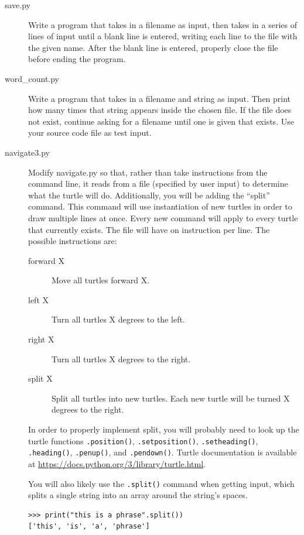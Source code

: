 \documentclass[11pt]{cselabheader}
\begin{document}
\begin{description}
\item[save.py] Write a program that takes in a filename as input, then takes in a series of lines of input until a blank line is entered, writing each line to the file with the given name. After the blank line is entered, properly close the file before ending the program.
\item[word\_count.py] Write a program that takes in a filename and string as input. Then print how many times that string appears inside the chosen file. If the file does not exist, continue asking for a filename until one is given that exists. Use your source code file as test input.
\item[navigate3.py] Modify navigate.py so that, rather than take instructions from the command line, it reads from a file (specified by user input) to determine what the turtle will do. Additionally, you will be adding the ``split'' command. This command will use instantiation of new turtles in order to draw multiple lines at once. Every new command will apply to every turtle that currently exists. The file will have on instruction per line. The possible instructions are:

  \begin{description}
    \item[forward X] Move all turtles forward X.
    \item[left X] Turn all turtles X degrees to the left.
    \item[right X] Turn all turtles X degrees to the right.
    \item[split X] Split all turtles into new turtles. Each new turtle will be turned X degrees to the right.
  \end{description}

  In order to properly implement split, you will probably need to look up the turtle functions \lstinline{.position()}, \lstinline{.setposition()}, \lstinline{.setheading()}, \lstinline{.heading()}, \lstinline{.penup()}, and \lstinline{.pendown()}. Turtle documentation is available at \url{https://docs.python.org/3/library/turtle.html}.

  You will also likely use the \lstinline{.split()} command when getting input, which splits a single string into an array around the string's spaces.
  \begin{lstlisting}[style=ipython]
>>> print("this is a phrase".split())
['this', 'is', 'a', 'phrase']
  \end{lstlisting}


\end{description}
\end{document}
